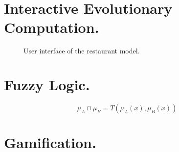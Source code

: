 \section{Interactive Evolutionary Computation.}
\begin{figure}
\captionsetup{justification=centering,margin=2cm}
\centering
\setlength\fboxsep{0pt}
\setlength\fboxrule{0.7pt}
\caption{User interface of the restaurant model.}
\label{fig:restaurantmodel}       
\end{figure}


\section{Fuzzy Logic.}

\begin{equation}\label{eq:prediction}
\displaystyle \mu_A\cap \mu_B = T(\mu_A(x),\mu_ B(x))  
\end{equation}

\section{Gamification.}


